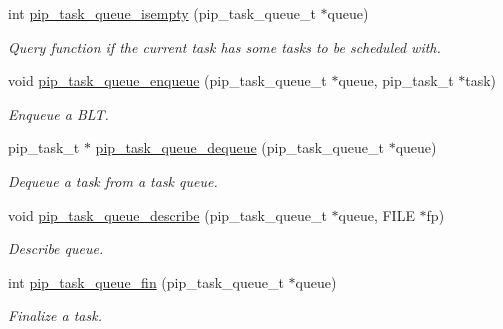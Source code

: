 \begin{DoxyCompactItemize}
\item 
int \hyperlink{group__libpip_gabf772cd5ea121458291801a26dea5c9d}{pip\-\_\-task\-\_\-queue\-\_\-isempty} (pip\-\_\-task\-\_\-queue\-\_\-t $\ast$queue)
\begin{DoxyCompactList}\small\item\em Query function if the current task has some tasks to be scheduled with. \end{DoxyCompactList}\end{DoxyCompactItemize}
\begin{DoxyCompactItemize}
\item 
void \hyperlink{group__libpip_gae0f80336f51c43c3da988dd0467453cf}{pip\-\_\-task\-\_\-queue\-\_\-enqueue} (pip\-\_\-task\-\_\-queue\-\_\-t $\ast$queue, pip\-\_\-task\-\_\-t $\ast$task)
\begin{DoxyCompactList}\small\item\em Enqueue a B\-L\-T. \end{DoxyCompactList}\end{DoxyCompactItemize}
\begin{DoxyCompactItemize}
\item 
pip\-\_\-task\-\_\-t $\ast$ \hyperlink{group__libpip_ga943bace202c72533951df9fc43f62277}{pip\-\_\-task\-\_\-queue\-\_\-dequeue} (pip\-\_\-task\-\_\-queue\-\_\-t $\ast$queue)
\begin{DoxyCompactList}\small\item\em Dequeue a task from a task queue. \end{DoxyCompactList}\end{DoxyCompactItemize}
\begin{DoxyCompactItemize}
\item 
void \hyperlink{group__libpip_ga7fdea4628abd0c38779276b6cd8ebd3f}{pip\-\_\-task\-\_\-queue\-\_\-describe} (pip\-\_\-task\-\_\-queue\-\_\-t $\ast$queue, F\-I\-L\-E $\ast$fp)
\begin{DoxyCompactList}\small\item\em Describe queue. \end{DoxyCompactList}\end{DoxyCompactItemize}
\begin{DoxyCompactItemize}
\item 
int \hyperlink{group__libpip_ga45d0eaa7122e459ea19187c148b9da10}{pip\-\_\-task\-\_\-queue\-\_\-fin} (pip\-\_\-task\-\_\-queue\-\_\-t $\ast$queue)
\begin{DoxyCompactList}\small\item\em Finalize a task. \end{DoxyCompactList}\end{DoxyCompactItemize}
